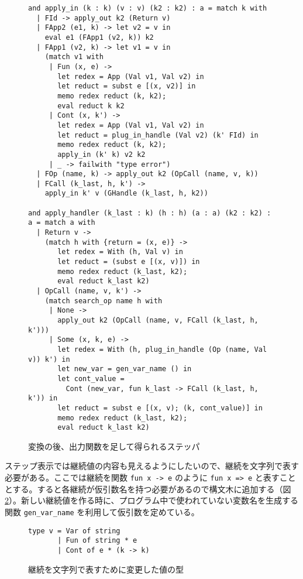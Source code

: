 \begin{figure}
\begin{verbatim}
and apply_in (k : k) (v : v) (k2 : k2) : a = match k with
  | FId -> apply_out k2 (Return v)
  | FApp2 (e1, k) -> let v2 = v in
    eval e1 (FApp1 (v2, k)) k2
  | FApp1 (v2, k) -> let v1 = v in
    (match v1 with
     | Fun (x, e) ->
       let redex = App (Val v1, Val v2) in
       let reduct = subst e [(x, v2)] in
       memo redex reduct (k, k2);
       eval reduct k k2
     | Cont (x, k') ->
       let redex = App (Val v1, Val v2) in
       let reduct = plug_in_handle (Val v2) (k' FId) in
       memo redex reduct (k, k2);
       apply_in (k' k) v2 k2
     | _ -> failwith "type error")
  | FOp (name, k) -> apply_out k2 (OpCall (name, v, k))
  | FCall (k_last, h, k') ->
    apply_in k' v (GHandle (k_last, h, k2))

and apply_handler (k_last : k) (h : h) (a : a) (k2 : k2) : a = match a with
  | Return v ->
    (match h with {return = (x, e)} ->
       let redex = With (h, Val v) in
       let reduct = (subst e [(x, v)]) in
       memo redex reduct (k_last, k2);
       eval reduct k_last k2)
  | OpCall (name, v, k') ->
    (match search_op name h with
     | None ->
       apply_out k2 (OpCall (name, v, FCall (k_last, h, k')))
     | Some (x, k, e) ->
       let redex = With (h, plug_in_handle (Op (name, Val v)) k') in
       let new_var = gen_var_name () in
       let cont_value =
         Cont (new_var, fun k_last -> FCall (k_last, h, k')) in
       let reduct = subst e [(x, v); (k, cont_value)] in
       memo redex reduct (k_last, k2);
       eval reduct k_last k2)
\end{verbatim}
\caption{変換の後、出力関数を足して得られるステッパ}
\label{figure:5memo}
\end{figure}

ステップ表示では継続値の内容も見えるようにしたいので、継続を文字列で表す必要がある。ここでは継続を関数 \texttt{fun x -> e} のように \texttt{fun x => e} と表すこととする。すると各継続が仮引数名を持つ必要があるので構文木に追加する（図\ref{figure:v_5memo}）。新しい継続値を作る時に、プログラム中で使われていない変数名を生成する関数 \texttt{gen\_var\_name} を利用して仮引数を定めている。

\begin{figure}
\begin{verbatim}
type v = Var of string
       | Fun of string * e
       | Cont of e * (k -> k)
\end{verbatim}
\caption{継続を文字列で表すために変更した値の型}
\label{figure:v_5memo}
\end{figure}

